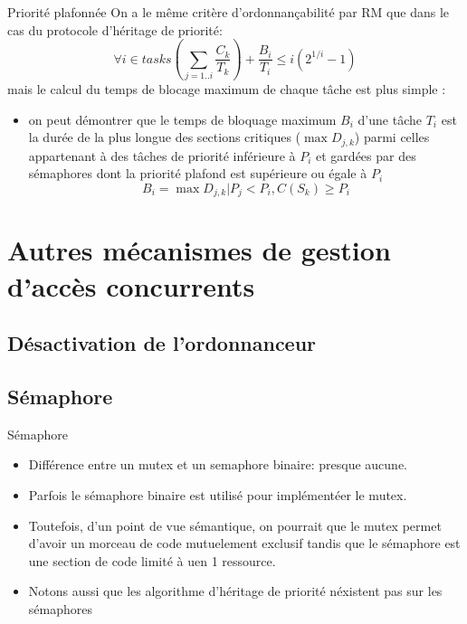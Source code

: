 \begin{frame}{Priorité plafonnée} 
  On a  le même critère d'ordonnançabilité  par RM que dans  le cas du
  protocole d'héritage de priorité:
  $$\forall i \in tasks \left( \sum_{j = 1..i} \frac{C_k}{T_k} \right) + \frac{B_i}{T_i} \le i(2^{1/i} - 1)$$
  mais le  calcul du  temps de blocage  maximum de chaque  tâche est
  plus simple :
    \begin{itemize}
    \item on  peut démontrer  que le temps  de bloquage  maximum $B_i$
      d'une tâche  $T_i$ est la durée  de la plus  longue des sections
      critiques ($\max D_{j,k}$) parmi celles appartenant à des tâches
      de  priorité inférieure à  $P_i$ et  gardées par  des sémaphores
      dont la priorité plafond est supérieure ou égale à $P_i$
      $$B_i = \max D_{j,k} | P_j < P_i, C(S_k) \ge P_i$$ 
    \end{itemize}
\end{frame}

\section{Autres mécanismes de gestion d'accès concurrents}

\subsection{Désactivation de l'ordonnanceur}


\subsection{Sémaphore}

\begin{frame}{Sémaphore}
  \begin{itemize} 
  \item  Différence entre un  mutex et  un semaphore  binaire: presque
    aucune.
  \item Parfois le sémaphore  binaire est utilisé pour implémentéer le
    mutex.
  \item Toutefois,  d'un point de  vue sémantique, on pourrait  que le
    mutex  permet  d'avoir un  morceau  de  code mutuelement  exclusif
    tandis que  le sémaphore est  une section de  code limité à  uen 1
    ressource.
  \item  Notons  aussi  que  les  algorithme  d'héritage  de  priorité
    néxistent pas sur les sémaphores
  \end{itemize} 
\end{frame} 


